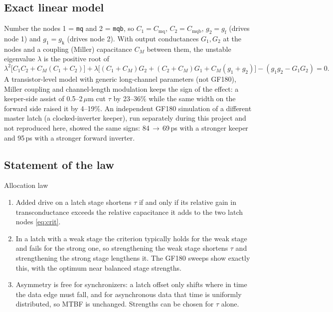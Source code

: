 \documentclass[11pt]{article}
\newcommand{\gf}{g_{\mathrm{f}}}
\newcommand{\gk}{g_{\mathrm{k}}}
\newcommand{\Cq}{C_{\mathrm{mq}}}
\newcommand{\Cqb}{C_{\mathrm{mqb}}}
\begin{document}
\subsection{Exact linear model}
Number the nodes 1 = \texttt{mq} and 2 = \texttt{mqb}, so $C_1=\Cq$, $C_2=\Cqb$, $g_2=\gf$ (drives node 1) and
$g_1=\gk$ (drives node 2). With output conductances $G_1,G_2$ at the nodes and a coupling (Miller) capacitance $C_M$
between them, the unstable eigenvalue $\lambda$ is the positive root of
\begin{equation}
\lambda^2\big[C_1C_2 + C_M(C_1+C_2)\big] + \lambda\big[(C_1{+}C_M)G_2 + (C_2{+}C_M)G_1 + C_M(g_1{+}g_2)\big]
- (g_1g_2 - G_1G_2) = 0 .
\end{equation}
A transistor-level model with generic long-channel parameters (not GF180), Miller coupling and channel-length
modulation keeps the sign of the effect: a keeper-side assist of 0.5--2\,$\mu$m cut $\tau$ by 23--36\% while the same
width on the forward side raised it by 4--19\%. An independent GF180 simulation of a different master latch (a
clocked-inverter keeper), run separately during this project and not reproduced here, showed the same signs:
84\,$\to$\,69\,ps with a stronger keeper and 95\,ps with a stronger forward inverter.

\subsection{Statement of the law}
\begin{keybox}{Allocation law}
\begin{enumerate}[leftmargin=14pt]
\item Added drive on a latch stage shortens $\tau$ if and only if its relative gain in transconductance exceeds
  the relative capacitance it adds to the two latch nodes \eqref{eq:crit}.
\item In a latch with a weak stage the criterion typically holds for the weak stage and fails for the strong
  one, so strengthening the weak stage shortens $\tau$ and strengthening the strong stage lengthens it. The GF180
  sweeps show exactly this, with the optimum near balanced stage strengths.
\item Asymmetry is free for synchronizers: a latch offset only shifts where in time the data edge must fall, and
  for asynchronous data that time is uniformly distributed, so MTBF is unchanged. Strengths can be chosen for
  $\tau$ alone.
\end{enumerate}
\end{keybox}
\end{document}
